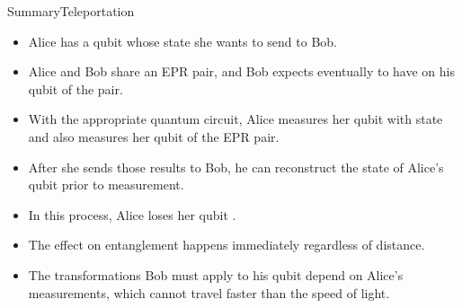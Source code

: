 \begin{frame}{Summary}{Teleportation}

\begin{itemize}
    \item Alice has a qubit whose state  she wants to send to Bob.
    \item Alice and Bob share an EPR pair, and Bob expects eventually to have  on his qubit of the pair.
    \item With the appropriate quantum circuit, Alice measures her qubit with state  and also measures her qubit of the EPR pair.
    \item After she sends those results to Bob, he can reconstruct the state of Alice's qubit prior to measurement.
    \item In this process, Alice loses her qubit .
    \item The effect on entanglement happens immediately regardless of distance.
    \item The transformations Bob must apply to his qubit depend on Alice's measurements, which cannot travel faster than the speed of light.
\end{itemize}
    
\end{frame}
